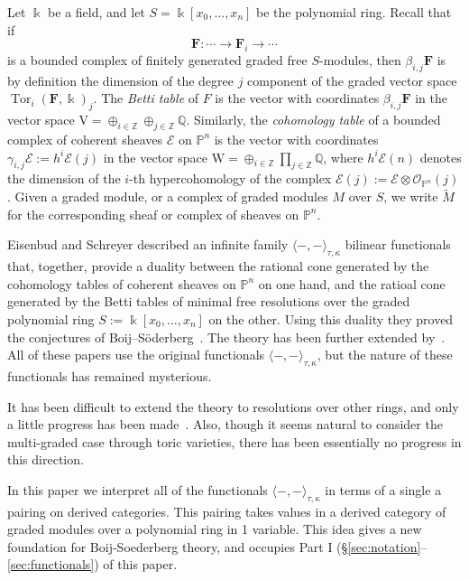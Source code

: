 \documentclass[12pt]{amsart}
\theoremstyle{definition}
\theoremstyle{remark}
\newcommand{\Tor}{\operatorname{Tor}}
\newcommand{\kk}{\Bbbk}
\newcommand{\PP}{\mathbb{P}}
\newcommand{\ZZ}{\mathbb{Z}}
\newcommand{\QQ}{\mathbb{Q}}
\newcommand{\VV}{\mathrm{V}}
\newcommand{\WW}{\mathrm{W}}
\newcommand{\cO}{\mathcal{O}}
\newcommand{\cE}{\mathcal{E}}
\newcommand{\FF}{\mathbf{F}}
\begin{document}
Let $\kk$ be a field, and let $S=\kk[x_0, \dots, x_n]$ be the polynomial ring. Recall that if 
$$
\FF: \cdots \to \FF_{i}\to \cdots
$$
is a bounded complex of finitely generated graded free $S$-modules, then $\beta_{i,j}\FF$ is by definition the dimension of the degree $j$ component of the graded vector space $\Tor_i(\FF,\kk)_j$.  The \emph{Betti table} of $F$ is the vector with coordinates $\beta_{i,j}\FF$ in the vector space $\VV = \oplus_{i\in \ZZ} \oplus_{j\in \ZZ}\QQ$. Similarly, the \emph{cohomology table} of a bounded complex of coherent sheaves $\cE$ on $\PP^{n}$ is the vector with coordinates $\gamma_{i,j}\cE := h^{i}\cE(j)$ in the vector space $\WW = \oplus_{i\in \ZZ}\prod_{j\in \ZZ}\QQ$, where $h^{i}\cE(n)$ denotes the dimension of the $i$-th hypercohomology of the complex $\cE(j) := \cE \otimes \cO_{\PP^{n}}(j)$. 
Given a graded module, or a complex of graded modules $M$ over $S$, we write $\widetilde M$ for the corresponding sheaf or complex of sheaves on $\PP^{n}$. 


Eisenbud and Schreyer \cite{eis-schrey1} described an infinite family $\langle -,-\rangle_{\tau,\kappa}$ bilinear functionals that, together, provide a duality between the rational cone generated by the cohomology tables of coherent sheaves on $\PP^n$ on one hand,  and the ratioal cone generated by the Betti tables of minimal free resolutions over the graded polynomial ring $S:=\kk[x_0, \dots, x_n]$ on the other. Using this duality they proved the conjectures of Boij--S\"oderberg~\cite{boij-sod1}. The theory has been further extended by~\cite{boij-sod2,eis-schrey2}. All of these papers use the original functionals $\langle -,-\rangle_{\tau,\kappa}$, but the nature of these functionals has remained mysterious. 

It has been difficult to extend the theory to resolutions over other rings, and only a little progress has been made~\cites{beks-local,boij-floystad,eis-schrey-abel,floystad-multigraded}. Also, though it seems natural to consider the multi-graded case through toric varieties, there has been essentially no progress in this direction.

In this paper we interpret all of the functionals $\langle-,-\rangle_{\tau,\kappa}$ in terms of a single a pairing on derived categories. This pairing takes values in a derived category of graded modules over a polynomial ring in 1 variable.  This idea gives a new foundation for Boij-Soederberg theory, and occupies Part I (\S\ref{sec:notation}--\ref{sec:functionals}) of this paper. 
\end{document}
